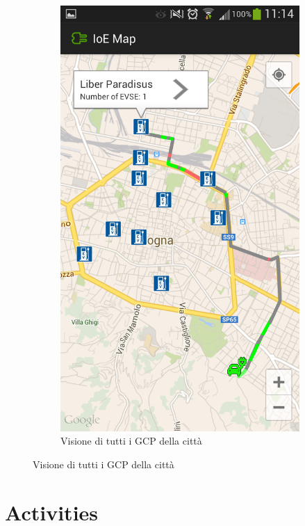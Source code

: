 \begin{figure}
\begin{subfigure}{0.45\textwidth}
		\includegraphics[width=\textwidth]{assets/mobile-app-map-gcp.png}
		\caption{Visione di tutti i GCP della città}
		\label{fig:map-gcp}
    \end{subfigure}
\end{figure}

\section{Activities}
